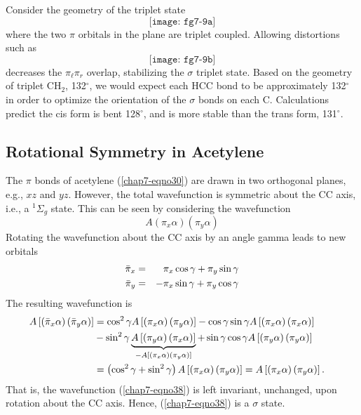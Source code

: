 Consider the geometry of the triplet state
\begin{equation}
\texttt{[image: fg7-9a]}
\label{chap7-eqno35}
\end{equation}
where the two $\pi$ orbitals in the plane are triplet coupled.  Allowing 
distortions such as
\begin{equation}
\texttt{[image: fg7-9b]}
\label{chap7-eqno37}
\end{equation}
decreases the $\pi_{\ell}\pi_r$ overlap, stabilizing the $\sigma$ triplet 
state.  Based on the geometry of triplet CH$_2$, 132$^{\circ}$, we would 
expect each HCC bond to be approximately 132$^{\circ}$ in order to optimize the 
orientation of the $\sigma$ bonds on each C.  Calculations predict 
the cis form is bent 128$^{\circ}$, and is more stable than the trans 
form, 131$^{\circ}$.

\subsection{Rotational Symmetry in Acetylene}

The $\pi$ bonds of acetylene (\ref{chap7-eqno30}) are drawn in two
orthogonal planes, e.g., $xz$ and $yz$.  However, the total
wavefunction is symmetric about the CC axis, i.e., a ${^1\Sigma}_g$
state. This can be seen by considering the wavefunction
\begin{equation}
A \left( \pi_x \alpha \right) \left( \pi_y \alpha \right)
\label{chap07-eqno38}
\end{equation}	
Rotating the wavefunction about the CC axis by an angle gamma 
leads to new orbitals
\begin{eqnarray}
{\bar{\pi}}_x &=& \pi_x \cos \gamma + \pi_y \sin \gamma\cr
{\bar{\pi}}_y &=& - \pi_x \sin \gamma + \pi_y \cos \gamma
\label{chap07-eqno39}
\end{eqnarray}
The resulting wavefunction is
\begin{eqnarray}
A \left[ \left( {\bar{\pi}}_x \alpha \right) \left( {\bar{\pi}}_y 
\alpha \right) \right] & = \cos^2 \gamma A \left[ \left( \pi_x \alpha 
\right) \left( \pi_y \alpha \right) \right] - \cos \gamma \sin \gamma 
A \left[ \left( \pi_x \alpha \right) \left( \pi_x \alpha \right) 
\right]\cr
& - \sin^2 \gamma \underbrace{A \left[ \left( \pi_y \alpha \right) \left( \pi_x 
\alpha \right) \right]}_{- A \left[ 
\left( \pi_x \alpha \right) \left( \pi_y \alpha \right) \right]}   
 + \sin \gamma \cos \gamma A \left[ \left( 
\pi_y \alpha \right) \left( \pi_y \alpha \right) \right]\cr
& = \left( \cos^2 \gamma + \sin^2 \gamma \right) A \left[ \left( 
\pi_x \alpha \right) \left( \pi_y \alpha \right) \right] = A \left[ 
\left( \pi_x \alpha \right) \left( \pi_y \alpha \right) 
\right].
\label{chap07-eqno40}
\end{eqnarray}
That is, the wavefunction (\ref{chap7-eqno38}) is left invariant,
unchanged, upon rotation about the CC axis.  Hence,
(\ref{chap7-eqno38}) is a $\sigma$ state.

